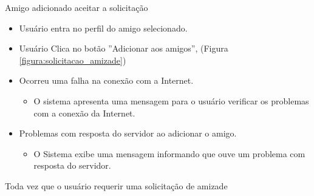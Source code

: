 {Amigo adicionado aceitar a solicitação}
{
\begin{itemize}
		\item Usuário entra no perfil do amigo selecionado.
		\item Usuário Clica no botão ''Adicionar aos amigos'', (Figura 			 	\ref{figura:solicitacao_amizade})	
\end{itemize}
}
{
\begin{itemize}
	\item Ocorreu uma falha na conexão com a Internet.
	\begin{itemize}
		\item O sistema apresenta uma mensagem para o usuário verificar os problemas com a conexão da Internet.
	\end{itemize}
	
	\item Problemas com resposta do servidor ao adicionar o amigo.
	\begin{itemize}
	\item O Sistema exibe uma mensagem informando que ouve um problema com resposta do servidor.
	\end{itemize}

\end{itemize}
}
{Toda vez que o usuário requerir uma solicitação de amizade}
{
 
}
